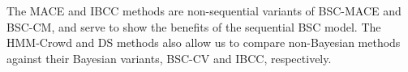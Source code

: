 
The MACE and IBCC methods are non-sequential variants of BSC-MACE and BSC-CM,
and serve to show the benefits of the sequential BSC model.
The HMM-Crowd and DS methods also allow us to compare non-Bayesian methods
against their Bayesian variants, BSC-CV and IBCC, respectively. 

